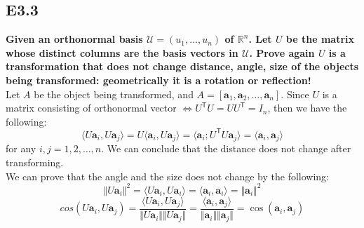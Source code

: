 \documentclass[12pt]{article}
\begin{document}
\subsection*{E3.3}
\textbf{Given an orthonormal basis $\mathcal{U}=(u_1,\dots,u_n)$ of $\mathbb{R}^n$. Let $U$ be the matrix whose distinct columns are the basis vectors in $\mathcal{U}$. Prove again $U$ is a transformation that does not change distance, angle, size of the objects being transformed: geometrically it is a rotation or reflection!}\\
Let $A$ be the object being transformed, and $A = [\mathbf{a}_1,\mathbf{a}_2,\ldots,\mathbf{a}_n]$. Since $U$ is a matrix consisting of orthonormal vector $\Leftrightarrow U^{\mathsf{T}}U=UU^{\mathsf{T}}=I_n$, then we have the following:
$$\langle U\mathbf{a}_i,U\mathbf{a}_j\rangle = U\langle \mathbf{a}_i,U\mathbf{a}_j\rangle=\langle \mathbf{a}_i;U^\mathsf{T}U\mathbf{a}_j\rangle = \langle \mathbf{a}_i,\mathbf{a}_j\rangle$$
for any $i,j=1,2,\ldots,n$. We can conclude that the distance does not change after transforming.\\
We can prove that the angle and the size does not change by the following: 
$$\Vert U\mathbf a_i\Vert^2 = \langle U\mathbf a_i, U\mathbf a_i \rangle = \langle \mathbf a_i,\mathbf a_i \rangle = \Vert \mathbf a_i \Vert^2$$
$$cos(U\mathbf a_i,U\mathbf a_j)=\frac{\langle U\mathbf a_i, U\mathbf a_j\rangle}{\Vert U\mathbf a_i \Vert \Vert U\mathbf a_j \Vert } = \frac{\langle \mathbf a_i,\mathbf a_j \rangle}{\Vert \mathbf a_i \Vert \Vert \mathbf a_j \Vert } = \cos(\mathbf a_i,\mathbf a_j)$$
		



\newpage 
\end{document}
